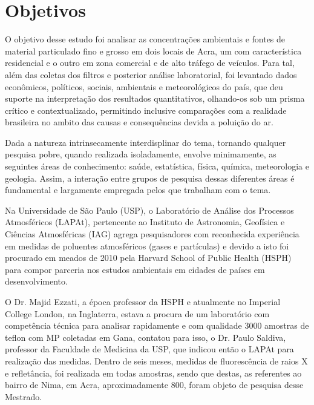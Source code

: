 \section{Objetivos}

O objetivo desse estudo foi analisar as concentrações ambientais e fontes de 
material particulado fino e grosso em dois locais de Acra, um com característica
residencial e o outro em zona comercial e de alto tráfego de veículos. 
Para tal, além das coletas dos filtros e posterior análise laboratorial, 
foi levantado dados econômicos, políticos, sociais, ambientais e 
meteorológicos do país, que deu suporte na interpretação dos resultados 
quantitativos, olhando-os sob um prisma crítico e contextualizado, permitindo
inclusive comparações com a realidade brasileira no ambito das causas e 
consequências devida a poluição do ar.

Dada a natureza intrinsecamente interdisplinar do tema, tornando qualquer 
pesquisa pobre, quando realizada isoladamente, envolve minimamente, as seguintes 
áreas de conhecimento: saúde, estatística, física, química, meteorologia e 
geologia. Assim, a interação entre grupos de pesquisa dessas diferentes áreas 
é fundamental e largamente empregada pelos que trabalham com o tema.

Na Universidade de São Paulo (USP), o Laboratório de Análise dos Processos 
Atmosféricos (LAPAt), pertencente ao Instituto de Astronomia, Geofísica e 
Ciências Atmosféricas (IAG) agrega pesquisadores com reconhecida experiência em 
medidas de poluentes atmosféricos (gases e partículas) e devido a isto foi 
procurado em meados de 2010 pela Harvard School of Public Health (HSPH) para 
compor parceria nos estudos ambientais em cidades de países em desenvolvimento. 

O Dr. Majid Ezzati, a época professor da HSPH e atualmente no Imperial College 
London, na Inglaterra, estava a procura de um laboratório com competência 
técnica para analisar rapidamente e com qualidade 3000 amostras de teflon 
com MP coletadas em Gana, contatou para isso, o Dr. Paulo Saldiva, professor 
da Faculdade de Medicina da USP, que indicou então o LAPAt para realização das
medidas. Dentro de seis meses, medidas de fluorescência de raios X e 
refletância, foi realizada em todas amostras, sendo que destas, as referentes
ao bairro de Nima, em Acra, aproximadamente 800, foram objeto de pesquisa desse
Mestrado.  

